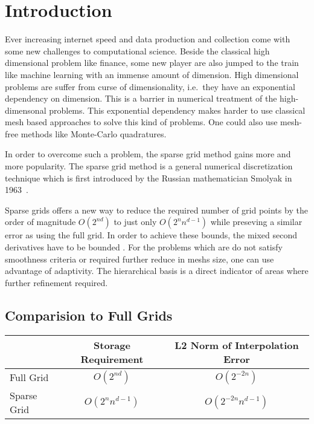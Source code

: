 \section{Introduction}

Ever increasing internet speed and data production and collection come with some new challenges to computational science.
Beside the classical high dimensional problem like finance, some new player are also jumped to the train like machine learning with an immense amount of dimension.
High dimensional problems are suffer from curse of dimensionality, i.e.\ they have an exponential dependency on dimension. This is a barrier in numerical treatment of the high-dimensonal problems.
This exponential dependency makes harder to use classical mesh based approaches to solve this kind of problems. One could also use mesh-free methods like Monte-Carlo quadratures.

In order to overcome such a problem, the sparse grid method gains more and more popularity.
The sparse grid method is a general numerical discretization technique which is first introduced by  the Russian mathematician Smolyak in 1963~\cite{smolyak1963quadrature}.

Sparse grids offers a new way to reduce the required number of grid points by the order of magnitude \(O(2^{nd})\) to just only \(O(2^n n^{d-1})\) while preseving a similar error as using the full grid.
In order to achieve these bounds, the mixed second derivatives have to be bounded . For the problems which are do not satisfy smoothness criteria or required further reduce in meshs size, one can use advantage of adaptivity.
The hierarchical basis is a direct indicator of areas where further refinement required.



\subsection{Comparision to Full Grids}

\begin{table}
    \centering
    \begin{tabular}{l c c}
        \multicolumn{1}{c}{} & Storage Requirement  & \multicolumn{1}{c}{L2 Norm of Interpolation Error} \\
        \toprule
        Full Grid            & \(O(2^{nd})\)        & \(O(2^{-2n})\)                                     \\
        \midrule
        Sparse Grid          & \(O(2^{n} n^{d-1})\) & \(O(2^{-2n} n^{d-1})\)                             \\
        \bottomrule
    \end{tabular}
\end{table}


